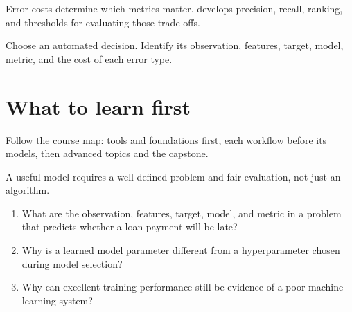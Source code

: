 \begin{intuition}
Error costs determine which metrics matter.  develops precision, recall, ranking, and thresholds for evaluating those trade-offs.
\end{intuition}

\begin{tryit}
Choose an automated decision. Identify its observation, features, target, model, metric, and the cost of each error type.
\end{tryit}

\section{What to learn first}

Follow the course map: tools and foundations first, each workflow before its models, then advanced topics and the capstone.

\begin{keyidea}
A useful model requires a well-defined problem and fair evaluation, not just an algorithm.
\end{keyidea}

\begin{quickcheck}
\begin{enumerate}
  \item What are the observation, features, target, model, and metric in a problem that predicts whether a loan payment will be late?
  \item Why is a learned model parameter different from a hyperparameter chosen during model selection?
  \item Why can excellent training performance still be evidence of a poor machine-learning system?
\end{enumerate}
\end{quickcheck}
